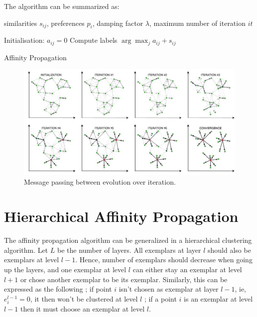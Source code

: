 \documentclass{ipol}
\begin{document}
The algorithm can be summarized as:
\begin{algorithm}[h]
  \SetLine
  similarities $s_{ij}$, preferences $p_i$, damping factor $\lambda$, maximum
  number of iteration $it$\;

  Initialisation: $a_{ij} = 0$\;
  Compute labels $\arg \max_{j} a_{ij} + s_{ij}$ \;
  \caption{Affinity Propagation}
\end{algorithm}

\begin{figure}
\includegraphics[width=500px]{./images/AP_frey.png}
\caption{Message passing between evolution over iteration.}
\end{figure}

\section{Hierarchical Affinity Propagation}

The affinity propagation algorithm can be generalized in a hierarchical
clustering algorithm. Let $L$ be the number of layers. All exemplars at layer
$l$ should also be exemplars at level $l -1$. Hence, number of exemplars
should decrease when going up the layers, and one exemplar at level $l$ can
either stay an exemplar at level $l + 1$ or chose another exemplar to be its
exemplar. Similarly, this can be expressed as the following ; if point $i$ isn't chosen as
exemplar at layer $l - 1$, ie, $e_{i}^{l - 1} = 0$, it then won't be clustered at
level $l$ ; if a point $i$ is an exemplar at level $l -1$ then it must choose
an exemplar at level $l$.\\
\end{document}
